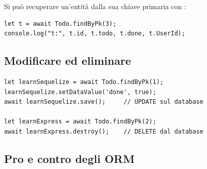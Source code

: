 Si può recuperare un'entità dalla sua chiave primaria con :

\begin{lstlisting}[style=js]
let t = await Todo.findByPk(3);
console.log("t:", t.id, t.todo, t.done, t.UserId);
\end{lstlisting}

\subsection{Modificare ed eliminare}

\begin{affianco}[0.55][c]
\begin{lstlisting}[style=js, name=update.js]
let learnSequelize = await Todo.findByPk(1);
learnSequelize.setDataValue('done', true);
await learnSequelize.save();     // UPDATE sul database

let learnExpress = await Todo.findByPk(2);
await learnExpress.destroy();    // DELETE dal database
\end{lstlisting}
\risultato
\begin{immagine}
\end{immagine}
\end{affianco}

\subsection{Pro e contro degli ORM}

